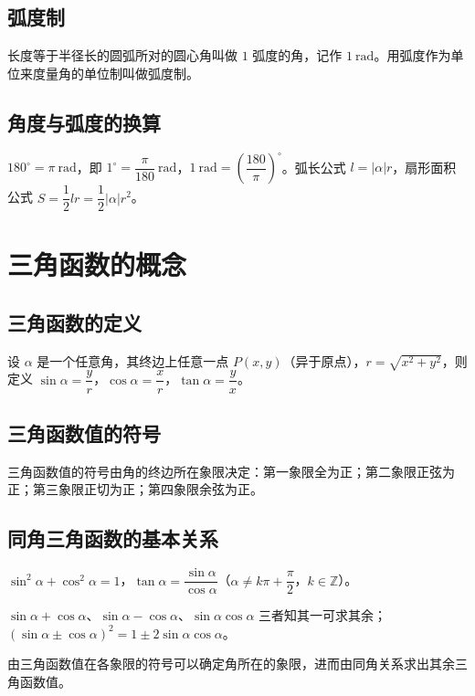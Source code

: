 \documentclass[lang=cn,newtx,10pt,scheme=chinese,nofont]{elegantbook}
\begin{document}
\subsection{弧度制}
\begin{definition}[弧度制]
长度等于半径长的圆弧所对的圆心角叫做 $1$ 弧度的角，记作 $1\ \mathrm{rad}$。用弧度作为单位来度量角的单位制叫做弧度制。
\end{definition}
\subsection{角度与弧度的换算}
\begin{definition}[角度与弧度的换算]
$180^\circ=\pi\ \mathrm{rad}$，即 $1^\circ=\dfrac{\pi}{180}\ \mathrm{rad}$，$1\ \mathrm{rad}=\left(\dfrac{180}{\pi}\right)^\circ$。弧长公式 $l=|\alpha| r$，扇形面积公式 $S=\dfrac{1}{2}lr=\dfrac{1}{2}|\alpha|r^2$。
\end{definition}

\section{三角函数的概念}
\subsection{三角函数的定义}
\begin{definition}[三角函数的定义]
设 $\alpha$ 是一个任意角，其终边上任意一点 $P(x,y)$（异于原点），$r=\sqrt{x^2+y^2}$，则定义 $\sin\alpha=\dfrac{y}{r}$，$\cos\alpha=\dfrac{x}{r}$，$\tan\alpha=\dfrac{y}{x}$。
\end{definition}
\subsection{三角函数值的符号}
\begin{definition}[三角函数值的符号]
三角函数值的符号由角的终边所在象限决定：第一象限全为正；第二象限正弦为正；第三象限正切为正；第四象限余弦为正。
\end{definition}
\subsection{同角三角函数的基本关系}
\begin{definition}[同角三角函数的基本关系]
$\sin^2\alpha+\cos^2\alpha=1$，$\tan\alpha=\dfrac{\sin\alpha}{\cos\alpha}$（$\alpha \neq k\pi+\dfrac{\pi}{2}$，$k \in \mathbb{Z}$）。
\end{definition}
\begin{theorem}[同角关系的常用变形]
$\sin\alpha+\cos\alpha$、$\sin\alpha-\cos\alpha$、$\sin\alpha\cos\alpha$ 三者知其一可求其余；$(\sin\alpha \pm \cos\alpha)^2=1 \pm 2\sin\alpha\cos\alpha$。
\end{theorem}
\begin{corollary}[三角函数值的符号与象限]
由三角函数值在各象限的符号可以确定角所在的象限，进而由同角关系求出其余三角函数值。
\end{corollary}
\end{document}
